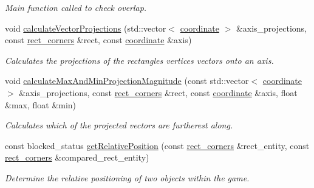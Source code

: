 \begin{DoxyCompactItemize}
\begin{DoxyCompactList}\small\item\em Main function called to check overlap. \end{DoxyCompactList}\item 
\hypertarget{class_geometry_engine_aad070884eb5c9380cd3d75a22e95ba8a}{void \hyperlink{class_geometry_engine_aad070884eb5c9380cd3d75a22e95ba8a}{calculate\+Vector\+Projections} (std\+::vector$<$ \hyperlink{structcoordinate}{coordinate} $>$ \&axis\+\_\+projections, const \hyperlink{structrect__corners}{rect\+\_\+corners} \&rect, const \hyperlink{structcoordinate}{coordinate} \&axis)}\label{class_geometry_engine_aad070884eb5c9380cd3d75a22e95ba8a}

\begin{DoxyCompactList}\small\item\em Calculates the projections of the rectangles vertices vectors onto an axis. \end{DoxyCompactList}\item 
\hypertarget{class_geometry_engine_ad5c9132e2ddc165f92ac81c021e21622}{void \hyperlink{class_geometry_engine_ad5c9132e2ddc165f92ac81c021e21622}{calculate\+Max\+And\+Min\+Projection\+Magnitude} (const std\+::vector$<$ \hyperlink{structcoordinate}{coordinate} $>$ \&axis\+\_\+projections, const \hyperlink{structrect__corners}{rect\+\_\+corners} \&rect, const \hyperlink{structcoordinate}{coordinate} \&axis, float \&max, float \&min)}\label{class_geometry_engine_ad5c9132e2ddc165f92ac81c021e21622}

\begin{DoxyCompactList}\small\item\em Calculates which of the projected vectors are furtherest along. \end{DoxyCompactList}\item 
\hypertarget{class_geometry_engine_a662ec9af09fd513700f41d3e7090b1bf}{const blocked\+\_\+status \hyperlink{class_geometry_engine_a662ec9af09fd513700f41d3e7090b1bf}{get\+Relative\+Position} (const \hyperlink{structrect__corners}{rect\+\_\+corners} \&rect\+\_\+entity, const \hyperlink{structrect__corners}{rect\+\_\+corners} \&compared\+\_\+rect\+\_\+entity)}\label{class_geometry_engine_a662ec9af09fd513700f41d3e7090b1bf}

\begin{DoxyCompactList}\small\item\em Determine the relative positioning of two objects within the game. \end{DoxyCompactList}\end{DoxyCompactItemize}


